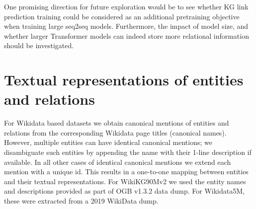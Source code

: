 \documentclass[11pt]{article}
\renewcommand\:{\colon} \newcommand{\sset}[1]{\left\{\,#1\,\right\}} \newcommand{\ssets}[1]{\left\{#1\right\}} \newcommand{\ssetn}[1]{\{\,#1\,\}}
\begin{document}
One promising direction for future exploration would be to see 
 whether KG link prediction training  could be considered as an additional pretraining objective when training large seq2seq models. 
Furthermore, the impact of model size, and whether larger Transformer models can indeed store more relational information should be investigated.











\appendix






\begin{table}[ht!]
    \centering
    \caption{Comparison of related work in terms of the desiderata described in .}
    \label{tab:desiderata}
\end{table}


\section{Textual representations of entities and relations}
\label{sec:text_rep_appendix}

For Wikidata based datasets we obtain canonical mentions of entities and relations from the corresponding Wikidata page titles (canonical names).
However, multiple entities can have identical canonical mentions;
we disambiguate such entities by appending the name with their 1-line description if available.
In all other cases of identical canonical mentions we extend each mention with a unique id. This results in a one-to-one mapping between entities and their textual representations. For WikiKG90Mv2 we used the entity names and descriptions provided as part of OGB v1.3.2 data dump. For Wikidata5M, these were extracted from a 2019 WikiData dump.
\end{document}
